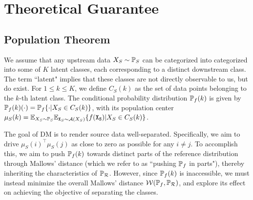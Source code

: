 \section{Theoretical Guarantee}\label{section: theory}
\subsection{Population Theorem}
\label{subsection: pop theorem}
We assume that any upstream data $X_S \sim \P_S$ can be categorized into categorized into some of $K$ latent classes, each corresponding to a distinct downstream class. The term ``latent" implies that these classes are not directly observable to us, but do exist. For $1 \leq k \leq K$, we define $C_S(k)$ as the set of data points belonging to the $k$-th latent class. The conditional probability distribution $\P_f(k)$ is given by $\P_f(k)(\cdot) = \P_f\{\cdot \vert X_S \in C_S(k)\}$, with its population center $\mu_S(k) = \E_{X_S \sim \P_S}\E_{\mathtt{X}_S \sim \mathcal{A}(X_S)}\{f(\mathtt{X_S})\vert X_S \in C_S(k)\}$. 

The goal of DM is to render source data well-separated. Specifically, we aim to drive $\mu_S(i)^\top\mu_S(j)$ as close to zero as possible for any $i \neq j$. To accomplish this, we aim to push $\P_f(k)$ towards distinct parts of the reference distribution through Mallows' distance (which we refer to as ``pushing $\P_f$ in parts"), thereby inheriting the characteristics of $\P_\mathcal{R}$. However, since $\P_f(k)$ is inaccessible, we must instead minimize the overall Mallows' distance $\mathcal{W}(\P_f, \P_\mathcal{R})$, and explore its effect on achieving the objective of separating the classes.

